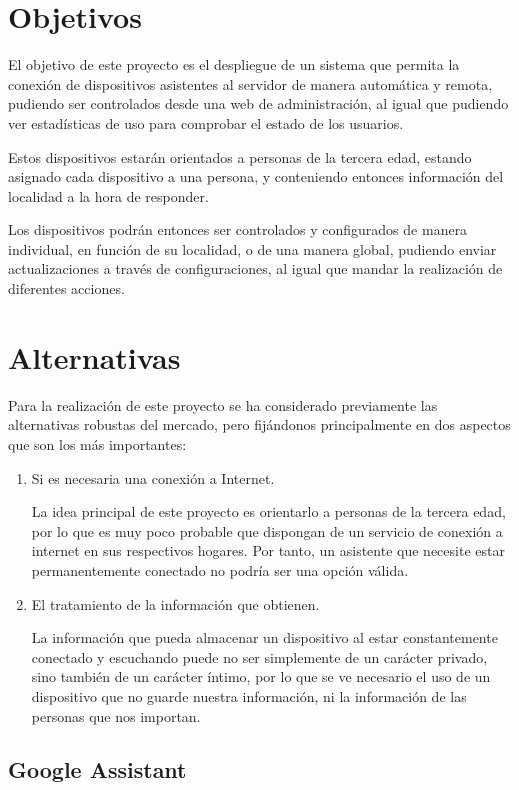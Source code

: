 \section{Objetivos}

El objetivo de este proyecto es el despliegue de un sistema que permita la conexión de dispositivos asistentes al servidor de manera automática y remota, pudiendo ser controlados desde una web de administración, al igual que pudiendo ver estadísticas de uso para comprobar el estado de los usuarios. 

Estos dispositivos estarán orientados a personas de la tercera edad, estando asignado cada dispositivo a una persona, y conteniendo entonces información del localidad a la hora de responder.

Los dispositivos podrán entonces ser controlados y configurados de manera individual, en función de su localidad, o de una manera global, pudiendo enviar actualizaciones a través de configuraciones, al igual que mandar la realización de diferentes acciones.

\section{Alternativas}

Para la realización de este proyecto se ha considerado previamente las alternativas robustas del mercado, pero fijándonos principalmente en dos aspectos que son los más importantes:
 \begin{enumerate}
     \item Si es necesaria una conexión a Internet.
     
La idea principal de este proyecto es orientarlo a personas de la tercera edad, por lo que es muy poco probable que dispongan de un servicio de conexión a internet en sus respectivos hogares. Por tanto, un asistente que necesite estar permanentemente conectado no podría ser una opción válida.
    \item El tratamiento de la información que obtienen.

La información que pueda almacenar un dispositivo al estar constantemente conectado y escuchando puede no ser simplemente de un carácter privado, sino también de un carácter íntimo, por lo que se ve necesario el uso de un dispositivo que no guarde nuestra información, ni la información de las personas que nos importan.

 \end{enumerate}

\subsection{Google Assistant}

